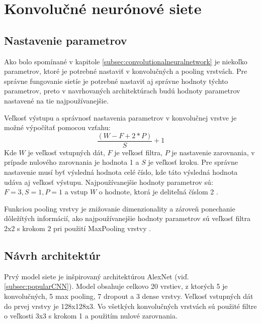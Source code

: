 
\section{Konvolučné neurónové siete}
\label{sec:architekuraCNN}

\subsection{Nastavenie parametrov}
\label{subsec:nastavenieparametrov}
Ako bolo spomínané v kapitole \ref{subsec:convolutionalneuralnetwork} je niekoľko parametrov, ktoré je potrebné
    nastaviť v konvolučných a pooling vrstvách.
Pre správne fungovanie sietíe je potrebné nastaviť aj správne hodnoty týchto parametrov, preto v navrhovaných architektúrach budú
    hodnoty parametrov nastavené na tie najpoužívanejšie.

Veľkosť výstupu a správnosť nastavenia parametrov v konvolučnej vrstve je možné výpočítať pomocou vzťahu:
\begin{equation}
    \frac{(W - F + 2*P)}{S} + 1
\end{equation}
Kde $W$ je veľkosť vstupných dát, $F$ je veľkosť filtra, $P$ je nastavenie zarovnania, v prípade nulového zarovnania je hodnota 1 a $S$ je veľkosť kroku.
Pre správne nastavenie musí byť výsledná hodnota celé číslo, kde táto výsledná hodnota udáva aj veľkosť výstupu.
Najpoužívanejšie hodnoty parametrov sú: $F = 3, S = 1, P = 1$ a vstup $W$ o hodnote, ktorá je deliteľná číslom 2 \cite{odkaz:CNNArchitecture}.

Funkciou pooling vrstvy je znižovanie dimenzionality a zároveň ponechanie dôležítých informácií, ako najpoužívanejšie hodnoty parametrov sú
    veľkosť filtra 2x2 s krokom 2 pri použití MaxPooling vrstvy \cite{odkaz:CNNArchitecture}.


\subsection{Návrh architektúr}
\label{subsec:navrharchitektur}
Prvý model siete je inšpirovaný architektúrou AlexNet (viď. \ref{subsec:popularCNN}).
Model obsahuje celkovo 20 vrstiev, z ktorých 5 je konvolučných, 5 max pooling, 7 dropout a 3 dense vrstvy.
Veľkosť vstupných dát do prvej vrstvy je 128x128x3.
Vo všetkých konvolučných vrstvách sú použité filtre o veľkosti 3x3 s krokom 1 a použitím nulové zarovnania.

